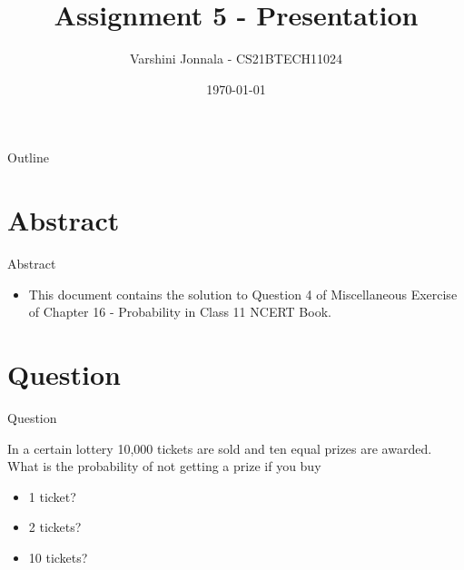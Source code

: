 \documentclass{beamer}
\title{Assignment 5 - Presentation}
\author{Varshini Jonnala - CS21BTECH11024}
\date{\today}
\begin{document}
\begin{frame}
    \titlepage 
\end{frame}

\begin{frame}{Outline}
    \tableofcontents
\end{frame}

\section{Abstract}
\begin{frame}{Abstract}
    \begin{itemize}
        \item This document contains the solution to Question 4 of Miscellaneous Exercise of Chapter 16 - Probability in Class 11 NCERT Book. 
    \end{itemize}
\end{frame}

\section{Question}
\begin{frame}{Question}

In a certain lottery 10,000 tickets are sold and ten equal prizes are awarded. What is the probability of not getting a prize if you buy
\begin{itemize}
    \item 1 ticket?
    \item 2 tickets?
    \item 10 tickets?
\end{itemize}

\end{frame}
\end{document}
